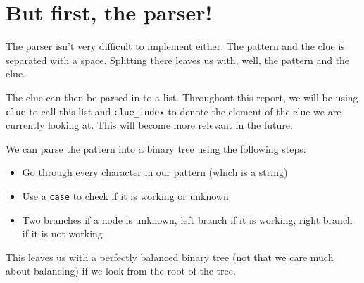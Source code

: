 \section{But first, the parser!}
The parser isn't very difficult to implement either. The pattern and the clue is separated with a space. Splitting there leaves us with, well, the pattern and the clue. 

The clue can then be parsed in to a list. Throughout this report, we will be using \texttt{clue} to call this list and \texttt{clue\_index} to denote the element of the clue we are currently looking at. This will become more relevant in the future.

We can parse the pattern into a binary tree using the following steps:
\begin{itemize}
    \item Go through every character in our pattern (which is a string)
    \item Use a \texttt{case} to check if it is working or unknown
    \item Two branches if a node is unknown, left branch if it is working, right branch if it is not working
\end{itemize}

This leaves us with a perfectly balanced binary tree (not that we care much about balancing) if we look from the root of the tree.
